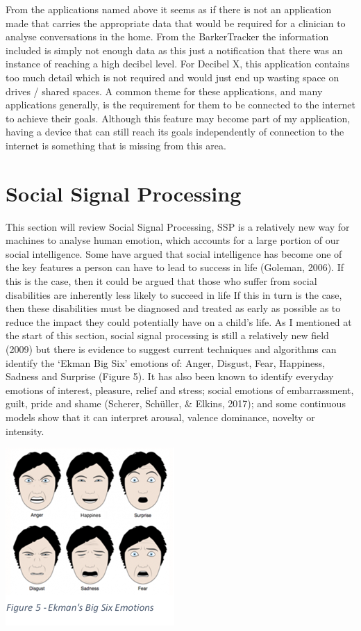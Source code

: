 \documentclass[a4paper,11pt]{report}
\begin{document}
From the applications named above it seems as if there is not an application made that carries the appropriate data that would be required for a clinician to analyse conversations in the home. From the BarkerTracker the information included is simply not enough data as this just a notification that there was an instance of reaching a high decibel level. For Decibel X, this application contains too much detail which is not required and would just end up wasting space on drives / shared spaces. A common theme for these applications, and many applications generally, is the requirement for them to be connected to the internet to achieve their goals. Although this feature may become part of my application, having a device that can still reach its goals independently of connection to the internet is something that is missing from this area.


\section{Social Signal Processing}
This section will review Social Signal Processing, SSP is a relatively new way for machines to analyse human emotion, which accounts for a large portion of our social intelligence. Some have argued that social intelligence has become one of the key features a person can have to lead to success in life (Goleman, 2006). If this is the case, then it could be argued that those who suffer from social disabilities are inherently less likely to succeed in life If this in turn is the case, then these disabilities must be diagnosed and treated as early as possible as to reduce the impact they could potentially have on a child’s life. As I mentioned at the start of this section, social signal processing is still a relatively new field (2009) but there is evidence to suggest current techniques and algorithms can identify the ‘Ekman Big Six’ emotions of: Anger, Disgust, Fear, Happiness, Sadness and Surprise (Figure 5). It has also been known to identify everyday emotions of interest, pleasure, relief and stress; social emotions of embarrassment, guilt, pride and shame (Scherer, Schüller, \& Elkins, 2017); and some continuous models show that it can interpret arousal, valence dominance, novelty or intensity. \\

\begin{center}
\includegraphics{Ekmans.PNG}
\end{center}
\end{document}
